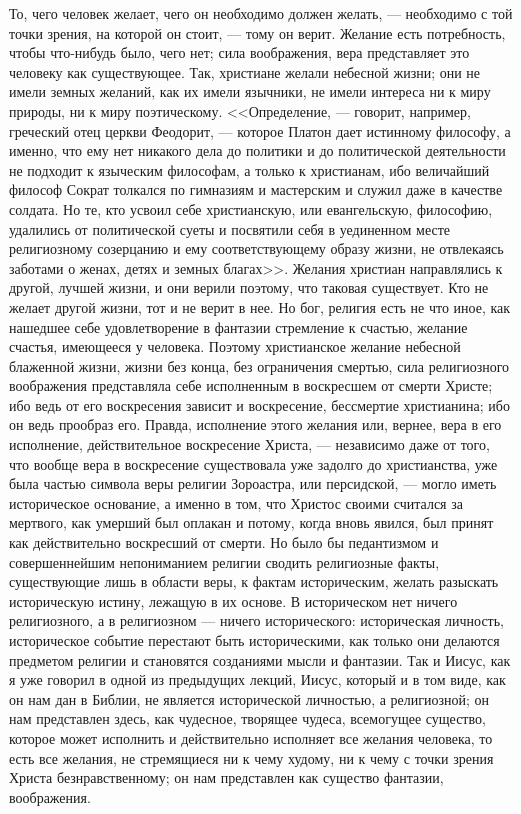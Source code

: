 \documentclass[12pt]{article}
\begin{document}
То, чего человек желает, чего он необходимо должен желать, --- необходимо с той точки зрения, на которой он стоит, --- тому он верит. Желание есть потребность, чтобы что-нибудь было, чего нет; сила воображения, вера представляет это человеку как существующее. Так, христиане желали небесной жизни; они не имели земных желаний, как их имели язычники, не имели интереса ни к миру природы, ни к миру поэтическому. <<Определение, --- говорит, например, греческий отец церкви Феодорит, --- которое Платон дает истинному философу, а именно, что ему нет никакого дела до политики и до политической деятельности не подходит к языческим философам, а только к христианам, ибо величайший философ Сократ толкался по гимназиям и мастерским и служил даже в качестве солдата. Но те, кто усвоил себе христианскую, или евангельскую, философию, удалились от политической суеты и посвятили себя в уединенном месте религиозному созерцанию и ему соответствующему образу жизни, не отвлекаясь заботами о женах, детях и земных благах>>. Желания христиан направлялись к другой, лучшей жизни, и они верили поэтому, что таковая существует. Кто не желает другой жизни, тот и не верит в нее. Но бог, религия есть не что иное, как нашедшее себе удовлетворение в фантазии стремление к счастью, желание счастья, имеющееся у человека. Поэтому христианское желание небесной блаженной жизни, жизни без конца, без ограничения смертью, сила религиозного воображения представляла себе исполненным в воскресшем от смерти Христе; ибо ведь от его воскресения зависит и воскресение, бессмертие христианина; ибо он ведь прообраз его. Правда, исполнение этого желания или, вернее, вера в его исполнение, действительное воскресение Христа, --- независимо даже от того, что вообще вера в воскресение существовала уже задолго до христианства, уже была частью символа веры религии Зороастра, или персидской, --- могло иметь историческое основание, а именно в том, что Христос своими считался за мертвого, как умерший был оплакан и потому, когда вновь явился, был принят как действительно воскресший от смерти. Но было бы педантизмом и совершеннейшим непониманием религии сводить религиозные факты, существующие лишь в области веры, к фактам историческим, желать разыскать историческую истину, лежащую в их основе. В историческом нет ничего религиозного, а в религиозном --- ничего исторического: историческая личность, историческое событие перестают быть историческими, как только они делаются предметом религии и становятся созданиями мысли и фантазии. Так и Иисус, как я уже говорил в одной из предыдущих лекций, Иисус, который и в том виде, как он нам дан в Библии, не является исторической личностью, а религиозной; он нам представлен здесь, как чудесное, творящее чудеса, всемогущее существо, которое может исполнить и действительно исполняет все желания человека, то есть все желания, не стремящиеся ни к чему худому, ни к чему с точки зрения Христа безнравственному; он нам представлен как существо фантазии, воображения. 
\end{document}
